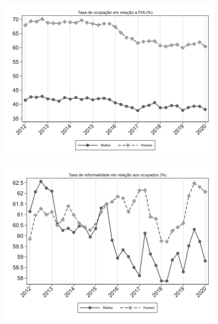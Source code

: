 \begin{frame}[label=_composicao_demografica_genero_taxa_de_ocupacao]{}
\textit{\hyperlink{_composicao_demografica_genero}{}}
\begin{figure}
  \centering
  \includegraphics[width=1\linewidth]{../../analysis/output/composicao_demografica/genero/_composicao_demografica_genero_taxa_de_ocupacao.png}
  \caption{}
  \label{fig:_composicao_demografica_genero_taxa_de_ocupacao}
\end{figure}
\end{frame}

\begin{frame}[label=_composicao_demografica_genero_taxa_de_informalidade]{}
\textit{\hyperlink{_composicao_demografica_genero}{}}
\begin{figure}
  \centering
  \includegraphics[width=1.0\linewidth]{../../analysis/output/composicao_demografica/genero/_composicao_demografica_genero_taxa_de_informalidade.png}
  \caption{}
  \label{fig:_composicao_demografica_genero_taxa_de_informalidade}
\end{figure}
\end{frame}

